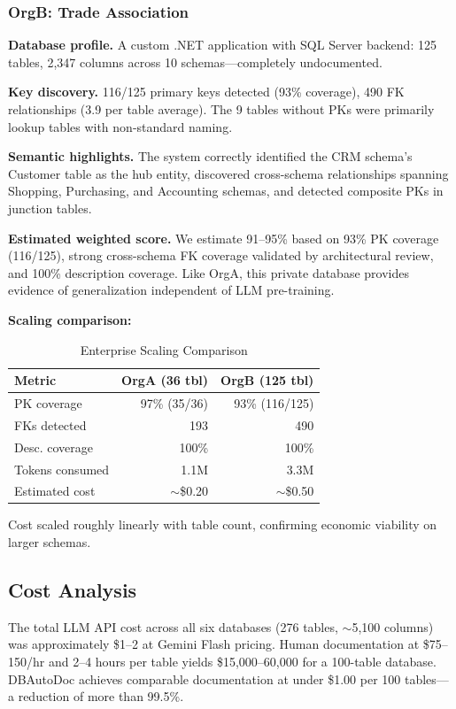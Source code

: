 \documentclass[sigconf, nonacm]{acmart}
\begin{document}
\subsubsection{OrgB: Trade Association}

\textbf{Database profile.} A custom .NET application with SQL Server backend: 125 tables, 2{,}347 columns across 10 schemas---completely undocumented.

\textbf{Key discovery.} 116/125 primary keys detected (93\% coverage), 490 FK relationships (3.9 per table average). The 9 tables without PKs were primarily lookup tables with non-standard naming.

\textbf{Semantic highlights.} The system correctly identified the CRM schema's Customer table as the hub entity, discovered cross-schema relationships spanning Shopping, Purchasing, and Accounting schemas, and detected composite PKs in junction tables.

\textbf{Estimated weighted score.} We estimate 91--95\% based on 93\% PK coverage (116/125), strong cross-schema FK coverage validated by architectural review, and 100\% description coverage. Like OrgA, this private database provides evidence of generalization independent of LLM pre-training.

\textbf{Scaling comparison:}

\begin{table}[htbp]
\caption{Enterprise Scaling Comparison}
\label{tab:enterprise}
\begin{tabular}{lrr}
\toprule
\textbf{Metric} & \textbf{OrgA (36 tbl)} & \textbf{OrgB (125 tbl)} \\
\midrule
PK coverage & 97\% (35/36) & 93\% (116/125) \\
FKs detected & 193 & 490 \\
Desc. coverage & 100\% & 100\% \\
Tokens consumed & 1.1M & 3.3M \\
Estimated cost & $\sim$\$0.20 & $\sim$\$0.50 \\
\bottomrule
\end{tabular}
\end{table}

Cost scaled roughly linearly with table count, confirming economic viability on larger schemas.

\subsection{Cost Analysis}

The total LLM API cost across all six databases (276 tables, $\sim$5{,}100 columns) was approximately \$1--2 at Gemini Flash pricing. Human documentation at \$75--150/hr and 2--4 hours per table yields \$15,000--60,000 for a 100-table database. DBAutoDoc achieves comparable documentation at under \$1.00 per 100 tables---a reduction of more than 99.5\%.
\end{document}

